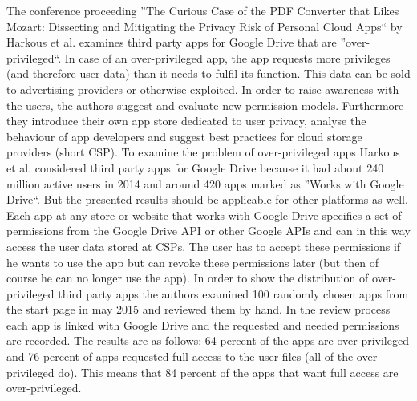 \documentclass[11pt,twocolumn,a4paper,DIV=calc]{scrartcl}
\begin{document}
The conference proceeding ''The Curious Case of the PDF Converter that Likes Mozart: Dissecting and Mitigating the Privacy Risk of Personal Cloud Apps`` by Harkous et al. examines third party apps for Google Drive that are ''over-privileged``. In case of an over-privileged app, the app requests more privileges (and therefore user data) than it needs to fulfil its function. This data can be sold to advertising providers or otherwise exploited. In order to raise awareness with the users, the authors suggest and evaluate new permission models. Furthermore they introduce their own app store dedicated to user privacy, analyse the behaviour of app developers and suggest best practices for cloud storage providers (short CSP).
To examine the problem of over-privileged apps Harkous et al. considered third party apps for Google Drive because it had about 240 million active users in 2014 and around 420 apps marked as ''Works with Google Drive``. But the presented results should be applicable for other platforms as well. Each app at any store or website that works with Google Drive specifies a set of permissions from the Google Drive API or other Google APIs and can in this way access the user data stored at CSPs. The user has to accept these permissions if he wants to use the app but can revoke these permissions later (but then of course he can no longer use the app). In order to show the distribution of over-privileged third party apps the authors examined 100 randomly chosen apps from the start page in may 2015 and reviewed them by hand. In the review process each app is linked with Google Drive and the requested and needed permissions are recorded. The results are as follows: 64 percent of the apps are over-privileged and 76 percent of apps requested full access to the user files (all of the over-privileged do). This means that 84 percent of the apps that want full access are over-privileged. \\
\end{document}
